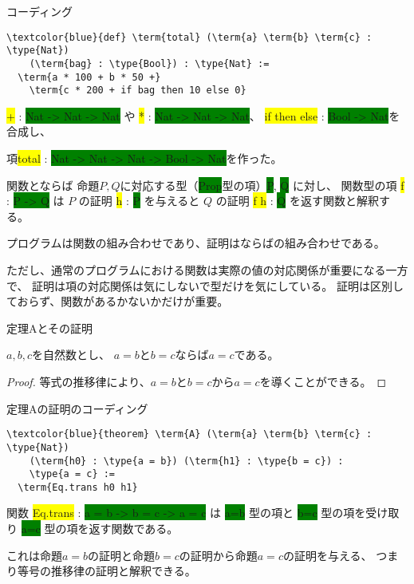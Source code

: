 \documentclass[unicode,12pt]{beamer}%
\newcommand{\type}[1]{\colorbox{green}{#1}}
\newcommand{\term}[1]{\colorbox{yellow}{#1}}
\begin{document}
\begin{frame}[fragile]{コーディング}
  \begin{tcolorbox}[title=SecondTheorems.lean]
  \setlength{\baselineskip}{12pt}
  \begin{Verbatim}[commandchars=\\\{\}, baselinestretch=1.5]
\textcolor{blue}{def} \term{total} (\term{a} \term{b} \term{c} : \type{Nat})
    (\term{bag} : \type{Bool}) : \type{Nat} :=
  \term{a * 100 + b * 50 +}
    \term{c * 200 + if bag then 10 else 0}
  \end{Verbatim}
  \end{tcolorbox}

  \term{+} : \type{Nat -> Nat -> Nat} や \term{*} : \type{Nat -> Nat -> Nat}、
  \term{if then else} : \type{Bool -> Nat}を合成し、

  項\term{total} : \type{Nat -> Nat -> Nat -> Bool -> Nat}を作った。
\end{frame}

\begin{frame}{関数とならば}
  命題$P, Q$に対応する型（\type{Prop}型の項）\type{P}, \type{Q} に対し、
  関数型の項 \term{f} : \type{P -> Q} は $P$ の証明 \term{h} : \type{P} を与えると $Q$ の証明 \term{f h} : \type{Q} を返す関数と解釈する。  

  プログラムは関数の組み合わせであり、証明はならばの組み合わせである。

  ただし、通常のプログラムにおける関数は実際の値の対応関係が重要になる一方で、
  証明は項の対応関係は気にしないで型だけを気にしている。
  証明は区別しておらず、関数があるかないかだけが重要。
\end{frame}

\begin{frame}{定理Aとその証明}
  \begin{theorem}
    $a, b, c$を自然数とし、
    $a=b$と$b=c$ならば$a=c$である。
  \end{theorem}

  \begin{proof}
    等式の推移律により、$a=b$と$b=c$から$a=c$を導くことができる。    
  \end{proof}
\end{frame}

\begin{frame}[fragile]{定理Aの証明のコーディング}
  \begin{tcolorbox}[title=SecondTheorems.lean]
  \setlength{\baselineskip}{12pt}
  \begin{Verbatim}[commandchars=\\\{\}, baselinestretch=1.5]
\textcolor{blue}{theorem} \term{A} (\term{a} \term{b} \term{c} : \type{Nat})
    (\term{h0} : \type{a = b}) (\term{h1} : \type{b = c}) :
    \type{a = c} :=
  \term{Eq.trans h0 h1}
  \end{Verbatim}
  \end{tcolorbox}  

  関数 \term{Eq.trans} : \type{a = b -> b = c -> a = c} は
  \type{a=b} 型の項と \type{b=c} 型の項を受け取り \type{a=c} 型の項を返す関数である。

  これは命題$a=b$の証明と命題$b=c$の証明から命題$a=c$の証明を与える、
  つまり等号の推移律の証明と解釈できる。
\end{frame}
\end{document}
